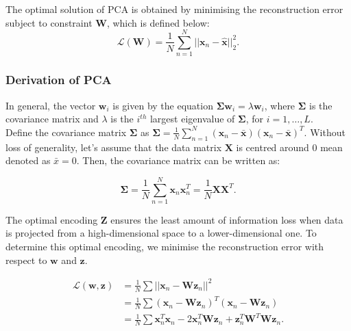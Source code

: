 \documentclass{article}\usepackage[]{graphicx}\usepackage[]{xcolor}
\numberwithin{equation}{section}
\begin{document}
{\noindent
The optimal solution of PCA is obtained by minimising the reconstruction error subject to constraint $\mathbf{W}$, which is defined below:
$$\mathcal{L}(\mathbf{W}) = \frac{1}{N}\sum_{n=1}^{N}||\mathbf{x}_n - \hat{\mathbf{x}}||^2_2.
$$

\subsubsection{Derivation of PCA}

In general, the vector $\mathbf{w}_i$ is given by the equation $\mathbf{\Sigma} \mathbf{w}_i = \lambda \mathbf{w}_i$, where $\mathbf{\Sigma}$ is the covariance matrix and $\lambda$ is the $i^{th}$ largest eigenvalue of $\mathbf{\Sigma}$, for $i = 1, \dots, L$.\\

\noindent
Define the covariance matrix $\mathbf{\Sigma}$ as $\mathbf{\Sigma} = \frac{1}{N} \sum_{n=1}^N(\mathbf{x}_n-\bar{\mathbf{x}})(\mathbf{x}_n-\bar{\mathbf{x}})^T$. Without loss of generality, let's assume that the data matrix $\mathbf{X}$ is centred around $0$ mean denoted as $\bar{x} = 0$. Then, the covariance matrix can be written as:

\begin{equation}
\mathbf{\Sigma} = \frac{1}{N} \sum_{n=1}^N\mathbf{x}_n\mathbf{x}_n^T = \frac{1}{N} \mathbf{X}\mathbf{X}^T. \label{eq:cov}
\end{equation}

\noindent
The optimal encoding $\mathbf{Z}$ ensures the least amount of information loss when data is projected from a high-dimensional space to a lower-dimensional one. To determine this optimal encoding, we minimise the reconstruction error with respect to $\mathbf{w}$ and $\mathbf{z}$.

\begin{equation}
\begin{aligned}
\mathcal{L}(\mathbf{w},\mathbf{z}) &= \frac{1}{N}\sum ||\mathbf{x}_n - \mathbf{W}\mathbf{z}_n||^2  \\
&= \frac{1}{N}\sum (\mathbf{x}_n - \mathbf{W}\mathbf{z}_n)^T(\mathbf{x}_n - \mathbf{W}\mathbf{z}_n)  \\
&= \frac{1}{N}\sum \mathbf{x}_n^T\mathbf{x}_n - 2\mathbf{x}_n^T\mathbf{W}\mathbf{z}_n+\mathbf{z}_n^T\mathbf{W}^T\mathbf{W}\mathbf{z}_n . \label{eq:lossfunc}
\end{aligned}
\end{equation}

}
\end{document}
